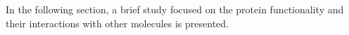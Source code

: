 In the following section, a brief study focused on the protein functionality and their interactions with other molecules is presented. 
%
%

%
%

